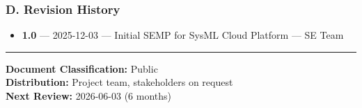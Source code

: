 \documentclass[12pt]{article}
\providecommand{\tightlist}{%
  \setlength{\itemsep}{0pt}\setlength{\parskip}{0pt}}
\begin{document}
\subsubsection{D. Revision History}\label{d.-revision-history}

\begin{itemize}
\tightlist
\item
  \textbf{1.0} --- 2025-12-03 --- Initial SEMP for SysML Cloud Platform
  --- SE Team
\end{itemize}

\begin{center}\rule{0.5\linewidth}{0.5pt}\end{center}

\textbf{Document Classification:} Public\\
\textbf{Distribution:} Project team, stakeholders on request\\
\textbf{Next Review:} 2026-06-03 (6 months)
\end{document}
